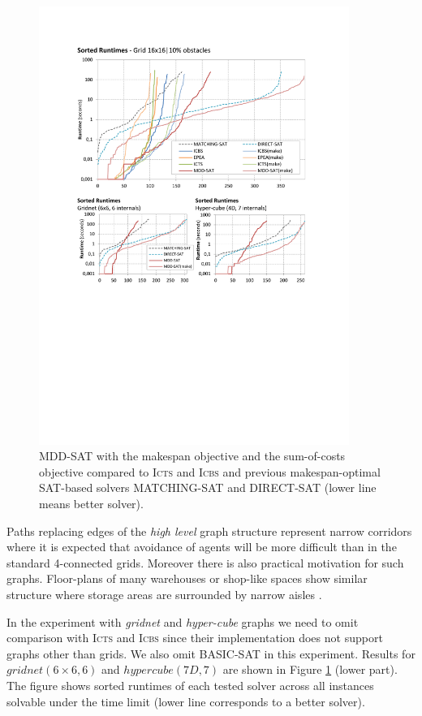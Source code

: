 \documentclass[jair,oneside,11pt]{article}
\begin{document}
\begin{figure}[h]
\centering
\includegraphics[trim={2.5cm 10.5cm 2.5cm 2.8cm},clip,width=0.9\textwidth]{expr_make+net-cube.pdf}
\vspace{-0.4cm}
\caption{MDD-SAT with the makespan objective and the sum-of-costs objective compared to \textsc{Icts} and \textsc{Icbs} and previous makespan-optimal SAT-based solvers MATCHING-SAT and DIRECT-SAT (lower line means better solver).} \label{figure-makespan-net-cube}
\end{figure}

Paths replacing edges of the \emph{high level} graph structure represent narrow corridors where it is expected that avoidance of agents will be more difficult than in the standard 4-connected grids. Moreover there is also practical motivation for such graphs. Floor-plans of many warehouses or shop-like spaces show similar structure where storage areas are surrounded by narrow aisles \cite{DBLP:conf/atal/ClaesOBT17,DBLP:conf/icarcv/TsangNWS18}.

In the experiment with {\em gridnet} and {\em hyper-cube} graphs we need to omit comparison with \textsc{Icts} and \textsc{Icbs} since their implementation does not support graphs other than grids. We also omit BASIC-SAT in this experiment. Results for $\mathit{gridnet}(6 \times 6, 6)$ and  $\mathit{hypercube}(7D, 7)$ are shown in Figure \ref{figure-makespan-net-cube} (lower part). The figure shows sorted runtimes of each tested solver across all instances solvable under the time limit (lower line corresponds to a better solver).
\end{document}
